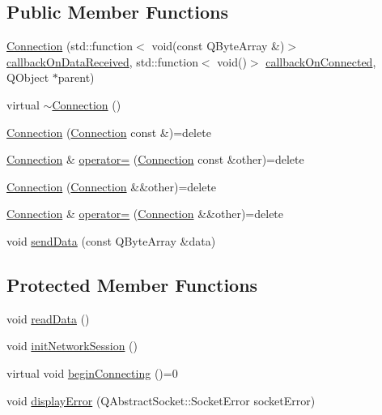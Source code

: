 \subsection*{Public Member Functions}
\begin{DoxyCompactItemize}
\item 
\hyperlink{classMODEL_1_1Connection_afde897e745ea37e60ff20b72a409a280}{Connection} (std\+::function$<$ void(const Q\+Byte\+Array \&)$>$ \hyperlink{classMODEL_1_1Connection_aa0b44072225e1b07b646bd973719ac80}{callback\+On\+Data\+Received}, std\+::function$<$ void()$>$ \hyperlink{classMODEL_1_1Connection_a0cb35149e127dbce2a09f0ac5d5cfc16}{callback\+On\+Connected}, Q\+Object $\ast$parent)
\item 
virtual \hyperlink{classMODEL_1_1Connection_a7a3e1a734e64796b393be72275bcb246}{$\sim$\+Connection} ()
\item 
\hyperlink{classMODEL_1_1Connection_adba016dc9c4adef32a776bce06277c44}{Connection} (\hyperlink{classMODEL_1_1Connection}{Connection} const \&)=delete
\item 
\hyperlink{classMODEL_1_1Connection}{Connection} \& \hyperlink{classMODEL_1_1Connection_a821cfec5ddc35d7ccb324adae37f82c4}{operator=} (\hyperlink{classMODEL_1_1Connection}{Connection} const \&other)=delete
\item 
\hyperlink{classMODEL_1_1Connection_a66608e31b9bba043aa4c7f11ecdda6ee}{Connection} (\hyperlink{classMODEL_1_1Connection}{Connection} \&\&other)=delete
\item 
\hyperlink{classMODEL_1_1Connection}{Connection} \& \hyperlink{classMODEL_1_1Connection_a4bef84588b92c963c1ad8ac70d67dc4c}{operator=} (\hyperlink{classMODEL_1_1Connection}{Connection} \&\&other)=delete
\item 
void \hyperlink{classMODEL_1_1Connection_ae31ebe57b25d10a93a635cad878834b0}{send\+Data} (const Q\+Byte\+Array \&data)
\end{DoxyCompactItemize}
\subsection*{Protected Member Functions}
\begin{DoxyCompactItemize}
\item 
void \hyperlink{classMODEL_1_1Connection_ab1703367762abc1490e00dcd5ccb29bc}{read\+Data} ()
\item 
void \hyperlink{classMODEL_1_1Connection_a37b4c359b4694947d5413d645feec8d5}{init\+Network\+Session} ()
\item 
virtual void \hyperlink{classMODEL_1_1Connection_ae3e484e0f3217ab38dbaa36f4a379f69}{begin\+Connecting} ()=0
\item 
void \hyperlink{classMODEL_1_1Connection_a4cc305570c43d0834291ef0b4c745c13}{display\+Error} (Q\+Abstract\+Socket\+::\+Socket\+Error socket\+Error)
\end{DoxyCompactItemize}
